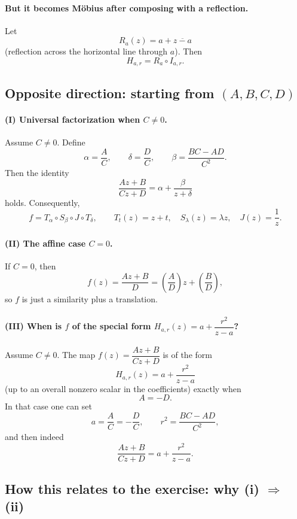 \begin{problem}[CP-IV-0069]
	\paragraph{\textbf{But it becomes Möbius after composing with a reflection.}}
	Let
	\[
	R_a(z)=a+\overline{z-a}
	\]
	(reflection across the horizontal line through $a$). Then
	\[
	H_{a,r}=R_a\circ I_{a,r}.
	\]

	\subsection*{\textbf{Opposite direction: starting from $(A,B,C,D)$}}

	\paragraph{\textbf{(I) Universal factorization when $C\neq 0$.}}
	Assume $C\neq 0$. Define
	\[
	\alpha=\frac{A}{C},\qquad
	\delta=\frac{D}{C},\qquad
	\beta=\frac{BC-AD}{C^{2}}.
	\]
	Then the identity
	\[
	\frac{Az+B}{Cz+D}=\alpha+\frac{\beta}{z+\delta}
	\]
	holds. Consequently,
	\[
	f=T_{\alpha}\circ S_{\beta}\circ J\circ T_{\delta},
	\qquad
	T_t(z)=z+t,\quad S_\lambda(z)=\lambda z,\quad J(z)=\frac{1}{z}.
	\]

	\paragraph{\textbf{(II) The affine case $C=0$.}}
	If $C=0$, then
	\[
	f(z)=\frac{Az+B}{D}=\left(\frac{A}{D}\right)z+\left(\frac{B}{D}\right),
	\]
	so $f$ is just a similarity plus a translation.

	\paragraph{\textbf{(III) When is $f$ of the special form $H_{a,r}(z)=a+\dfrac{r^{2}}{z-a}$?}}
	Assume $C\neq 0$. The map $f(z)=\dfrac{Az+B}{Cz+D}$ is of the form
	\[
	H_{a,r}(z)=a+\frac{r^{2}}{z-a}
	\]
	(up to an overall nonzero scalar in the coefficients) exactly when
	\[
	A=-D.
	\]
	In that case one can set
	\[
	a=\frac{A}{C}=-\frac{D}{C},
	\qquad
	r^{2}=\frac{BC-AD}{C^{2}},
	\]
	and then indeed
	\[
	\frac{Az+B}{Cz+D}=a+\frac{r^{2}}{z-a}.
	\]

	\subsection*{\textbf{How this relates to the exercise: why (i) $\Rightarrow$ (ii)}}


\end{problem}
